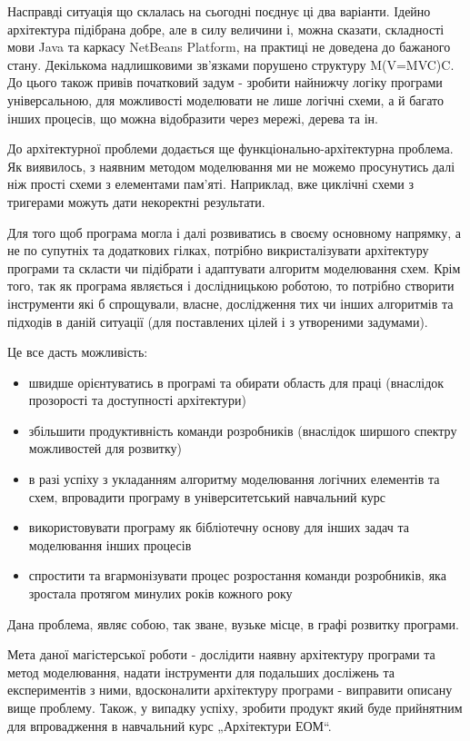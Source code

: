 \documentclass[12pt,a4paper]{article}
\begin{document}
Насправді ситуація що склалась на сьогодні поєднує ці два варіанти. Ідейно архітектура підібрана добре, але в силу величини і, можна сказати, складності мови Java та каркасу NetBeans Platform, на практиці не доведена до бажаного стану. Декількома надлишковими зв’язками порушено структуру M(V=MVC)C. До цього також привів початковий задум - зробити найнижчу логіку програми універсальною, для можливості моделювати не лише логічні схеми, а й багато інших процесів, що можна відобразити через мережі, дерева та ін.

До архітектурної проблеми додається ще функціонально-архітектурна проблема. Як виявилось, з наявним методом моделювання ми не можемо просунутись далі ніж прості схеми з елементами пам’яті. Наприклад, вже циклічні схеми з тригерами можуть дати некоректні результати.

Для того щоб програма могла і далі розвиватись в своєму основному напрямку, а не по супутніх та додаткових гілках, потрібно викристалізувати архітектуру програми та скласти чи підібрати і адаптувати алгоритм моделювання схем. Крім того, так як програма являється і дослідницькою роботою, то потрібно створити інструменти які б спрощували, власне, дослідження тих чи інших алгоритмів та підходів в даній ситуації (для поставлених цілей і з утвореними задумами).

Це все дасть можливість:
\begin{itemize}
  \item швидше орієнтуватись в програмі та обирати область для праці (внаслідок прозорості та доступності архітектури)
  \item збільшити продуктивність команди розробників (внаслідок ширшого спектру можливостей для розвитку)
  \item в разі успіху з укладанням алгоритму моделювання логічних елементів та схем, впровадити програму в університетський навчальний курс
  \item використовувати програму як бібліотечну основу для інших задач та моделювання інших процесів
  \item спростити та вгармонізувати процес розростання команди розробників, яка зростала протягом минулих років кожного року
\end{itemize}

Дана проблема, являє собою, так зване, вузьке місце, в графі розвитку програми.

Мета даної магістерської роботи - дослідити наявну архітектуру програми та метод моделювання, надати інструменти для подальших досліжень та експериментів з ними, вдосконалити архітектуру програми - виправити описану вище проблему. Також, у випадку успіху, зробити продукт який буде прийнятним для впровадження в навчальний курс „Архітектури ЕОМ“.
\end{document}
